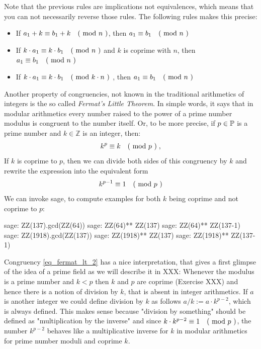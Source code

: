 Note that the previous rules are implications not equivalences, which means that you can not necessarily reverse those rules. The following rules makes this precise:
\begin{itemize}
\item If $a_1+k \equiv b_1+k \quad \text{( mod } n \text{ )}$, then $a_1 \equiv b_1 \quad \text{( mod } n \text{ )}$
\item If $k\cdot a_1 \equiv k\cdot b_1 \quad \text{( mod } n \text{ )}$ and $k$ is coprime with $n$, then $a_1 \equiv b_1 \quad \text{( mod } n \text{ )}$
\item If $k\cdot a_1 \equiv k\cdot b_1 \quad \text{( mod } k\cdot n \text{ )}$ , then $a_1 \equiv b_1 \quad \text{( mod } n \text{ )}$
\end{itemize}
Another property of congruencies, not known in the traditional arithmetics of integers is the so called \textit{Fermat's Little Theorem}. In simple words, it says that in modular arithmetics every number raised to the power of a prime number modulus is congruent to the number itself. Or, to be more precise, if $ p \in \mathbb{P} $ is a prime number and $ k \in \mathbb{Z} $ is an integer, then:
\begin{equation}
k ^ p \equiv k \quad \text{( mod } p \text{ )} \;,
\end{equation}
If $k$ is coprime to $p$, then we can divide both sides of this congruency by $k$ and rewrite the expression into the equivalent form 
\begin{equation}
\label{eq_fermat_lt_2}
k ^{p-1} \equiv 1 \quad \text{( mod } p \text{ )}
\end{equation} 
We can invoke sage, to compute examples for both $k$ being coprime and not coprime to $p$:
\begin{sagecommandline}
sage: ZZ(137).gcd(ZZ(64))
sage: ZZ(64)** ZZ(137) %
sage: ZZ(64)** ZZ(137-1) %
sage: ZZ(1918).gcd(ZZ(137))
sage: ZZ(1918)** ZZ(137) %
sage: ZZ(1918)** ZZ(137-1) %
\end{sagecommandline}
\begin{remark}
Congruency \ref{eq_fermat_lt_2} has a nice interpretation, that gives a first glimpse of the idea of a prime field as we will describe it in XXX: Whenever the modulus is a prime number and $k<p$ then $k$ and $p$ are coprime (Exercise XXX) and hence there is a notion of division by $k$, that is absent in integer arithmetics. If $a$ is another integer we could define division by $k$ as follows $a/k := a\cdot k^{p-2}$, which is always defined. This makes sense because "division by something" should be defined as "multiplication by the inverse" and since $k\cdot k ^{p-2} \equiv 1 \quad \text{( mod } p \text{ )}$, the number $k^{p-2}$ behaves like a multiplicative inverse for $k$ in modular arithmetics for prime number moduli and coprime $k$.
\end{remark}

